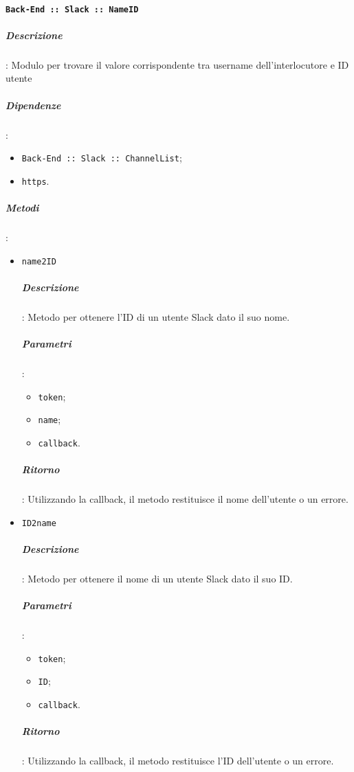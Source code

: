 \documentclass[../DefinizioneDiProdotto_v3.0.0.tex]{subfiles}
\begin{document}
\paragraph{\texttt{Back-End :: Slack :: NameID}}
\subparagraph{Descrizione}: Modulo per trovare il valore corrispondente tra username dell'interlocutore e ID utente
\subparagraph{Dipendenze}:
\begin{itemize}
	\item \texttt{Back-End :: Slack :: ChannelList};
	\item \texttt{https}.
\end{itemize}
\subparagraph{Metodi}:
\begin{itemize}
	\item \texttt{name2ID}
	      \subparagraph{Descrizione}: Metodo per ottenere l'ID di un utente Slack dato il suo nome.
	      \subparagraph{Parametri}:
	      \begin{itemize}
	      	\item \texttt{token};
	      	\item \texttt{name};
	      	\item \texttt{callback}.
	      \end{itemize}
	      \subparagraph{Ritorno}: Utilizzando la callback, il metodo restituisce il nome dell'utente o un errore.
	\item \texttt{ID2name}
	      \subparagraph{Descrizione}: Metodo per ottenere il nome di un utente Slack dato il suo ID.
	      \subparagraph{Parametri}:
	      \begin{itemize}
	      	\item \texttt{token};
	      	\item \texttt{ID};
	      	\item \texttt{callback}.
	      \end{itemize}
	      \subparagraph{Ritorno}: Utilizzando la callback, il metodo restituisce l'ID dell'utente o un errore.
\end{itemize}
\end{document}
